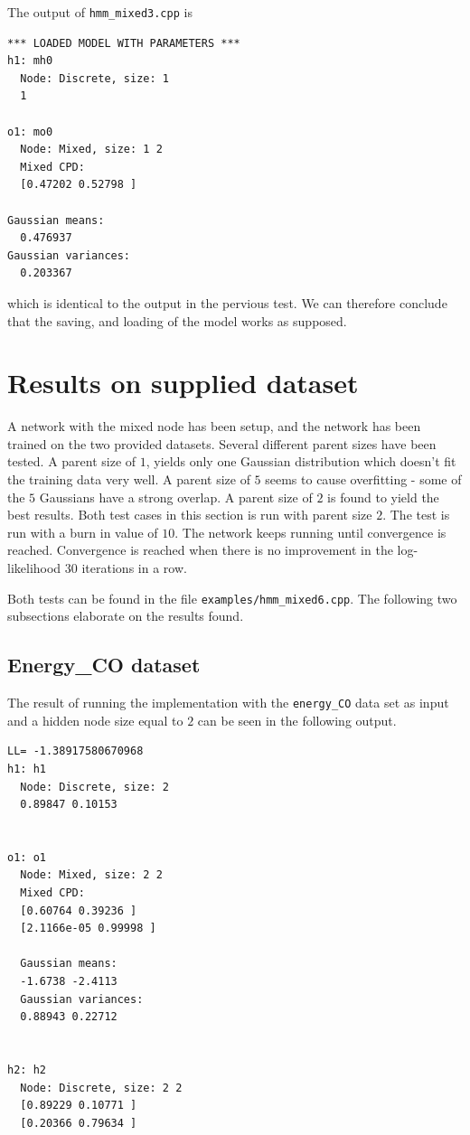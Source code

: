 \documentclass[10pt, journal, compsoc, a4paper]{IEEEtran}
\begin{document}
The output of \texttt{hmm\_mixed3.cpp} is 

\begin{verbatim}
*** LOADED MODEL WITH PARAMETERS ***
h1: mh0
  Node: Discrete, size: 1 
  1 

o1: mo0
  Node: Mixed, size: 1 2 
  Mixed CPD: 
  [0.47202 0.52798 ]

Gaussian means: 
  0.476937 
Gaussian variances: 
  0.203367   
\end{verbatim}
which is identical to the output in the pervious test. We can therefore conclude that the saving, and loading of the model works as supposed.




\section{Results on supplied dataset} %
\label{sec:results}
A network with the mixed node has been setup, and the network has been trained on the two provided datasets. Several different parent sizes have been tested. A parent size of $1$, yields only one Gaussian distribution which doesn't fit the training data very well. A parent size of $5$ seems to cause overfitting - some of the $5$ Gaussians have a strong overlap. A parent size of $2$ is found to yield the best results. Both test cases in this section is run with parent size $2$. The test is run with a burn in value of $10$. The network keeps running until convergence is reached. Convergence is reached when there is no improvement in the log-likelihood $30$ iterations in a row.

Both tests can be found in the file \texttt{examples/hmm\_mixed6.cpp}. The following two subsections elaborate on the results found.

\subsection{Energy\_CO dataset} %
\label{sub:energy_co_dataset}

The result of running the implementation with the \texttt{energy\_CO} data set as input and a hidden node size equal to $2$ can be seen in the following output.

\begin{verbatim}
LL= -1.38917580670968
h1: h1
  Node: Discrete, size: 2 
  0.89847 0.10153 


o1: o1
  Node: Mixed, size: 2 2 
  Mixed CPD: 
  [0.60764 0.39236 ]
  [2.1166e-05 0.99998 ]

  Gaussian means: 
  -1.6738 -2.4113 
  Gaussian variances: 
  0.88943 0.22712 


h2: h2
  Node: Discrete, size: 2 2 
  [0.89229 0.10771 ]
  [0.20366 0.79634 ]
\end{verbatim}
\end{document}
